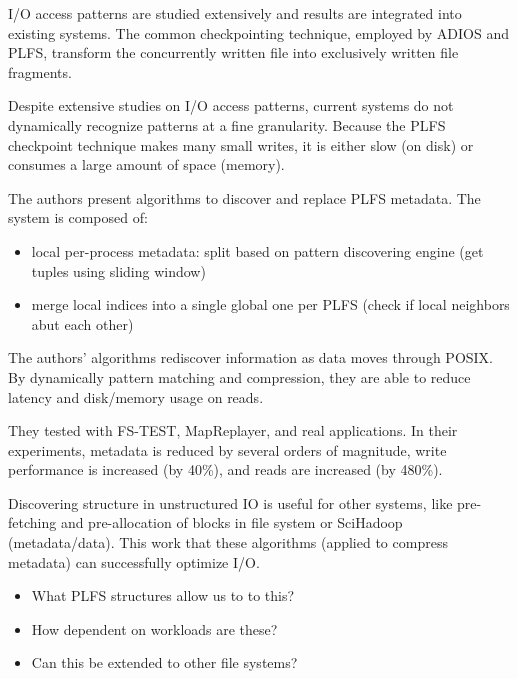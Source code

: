 I/O access patterns are studied extensively and results are integrated into
existing systems. The common checkpointing technique, employed by ADIOS and
PLFS, transform the concurrently written file into exclusively written file
fragments. 

Despite extensive studies on I/O access patterns, current systems do not
dynamically recognize patterns at a fine granularity. Because the PLFS
checkpoint technique makes many small writes, it is either slow (on disk) or
consumes a large amount of space (memory).  

The authors present algorithms to discover and replace PLFS metadata. The
system is composed of: 

\begin{itemize}

  \item local per-process metadata: split based on pattern discovering engine
  (get tuples using sliding window)

  \item merge local indices into a single global one per PLFS (check if local
  neighbors abut each other)

\end{itemize}

The authors' algorithms rediscover information as data moves through POSIX. By
dynamically  pattern matching and compression, they are able to reduce latency
and disk/memory usage on reads. 

They tested with FS-TEST, MapReplayer, and real applications. In their
experiments, metadata is reduced by several orders of magnitude, write
performance is increased (by 40\%), and reads are increased (by 480\%). 


Discovering structure in unstructured IO is useful for other systems, like
pre-fetching and pre-allocation of blocks in file system or SciHadoop
(metadata/data). This work that these algorithms (applied to compress metadata)
can successfully optimize I/O. 

\begin{itemize}

  \item What PLFS structures allow us to to this?

  \item How dependent on workloads are these?

  \item Can this be extended to other file systems?

\end{itemize}

